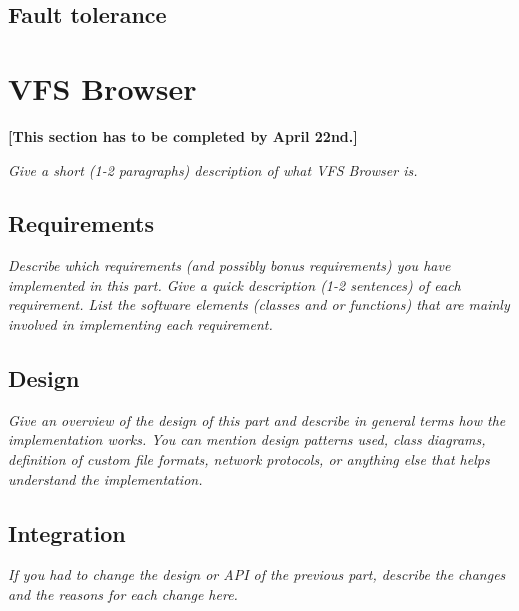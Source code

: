 \documentclass[a4paper,12pt]{article}
\begin{document}
\subsection{Fault tolerance}



\section{VFS Browser}

\textbf{[This section has to be completed by April 22nd.]}

\emph{Give a short (1-2 paragraphs) description of what VFS Browser is.}


\subsection{Requirements}

\emph{Describe which requirements (and possibly bonus requirements) you have implemented in this part. Give a quick description (1-2 sentences) of each requirement. List the software elements (classes and or functions) that are mainly involved in implementing each requirement.}


\subsection{Design}

\emph{Give an overview of the design of this part and describe in general terms how the implementation works. You can mention design patterns used, class diagrams, definition of custom file formats, network protocols, or anything else that helps understand the implementation.}


\subsection{Integration}

\emph{If you had to change the design or API of the previous part, describe the changes and the reasons for each change here.}



\end{document}
